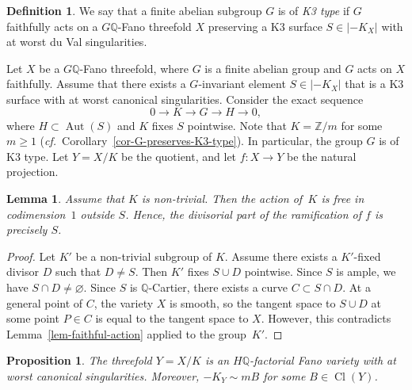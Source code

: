 \documentclass[11pt]{amsart}
\numberwithin{equation}{section}
\newtheorem{proposition}[thm]{Proposition}
\newtheorem{lem}[thm]{Lemma}
\theoremstyle{definition}
\newtheorem{defin}[thm]{Definition}
\theoremstyle{remark}
\let\emptyset\varnothing
\newcommand{\lra}{\longrightarrow}
\DeclareMathOperator{\Cl}{Cl}
\DeclareMathOperator{\Aut}{Aut}
\begin{document}
\begin{defin}
We say that a finite abelian subgroup $G$ is of \emph{K3 type} if $G$ faithfully acts on a $G\mathbb{Q}$-Fano threefold $X$ preserving a K3 surface $S\in|-K_X|$ with at worst du Val singularities.
\end{defin}

  
Let $X$ be a $G\mathbb{Q}$-Fano threefold, where $G$ is a finite abelian group and $G$ acts on $X$ faithfully. Assume that there exists a $G$-invariant element $S\in |-K_X|$ that is a K3 surface with at worst canonical singularities. Consider the  exact sequence
\[
0\lra K \lra G\lra H\lra 0, 
\]
where $H\subset \Aut(S)$ and $K$ fixes $S$ pointwise.  Note that $K=\mathbb{Z}/m$ for some $m\geq 1$ (\textit{cf.}~Corollary~\ref{cor-G-preserves-K3-type}).  In particular, the group $G$ is of K3 type.  Let $Y=X/K$ be the quotient, and let $f\colon X\to Y$ be the natural projection.

\begin{lem}
\label{lem-for-thm-2}
Assume that $K$ is non-trivial. 
Then the action of\, $K$ is free in codimension~$1$ outside $S$. 
Hence, the divisorial part of the ramification of $f$ is precisely $S$. 
\end{lem}

\begin{proof}
Let $K'$ be a non-trivial subgroup of $K$. 
Assume there exists a $K'$-fixed divisor $D$ such that $D\neq S$. 
Then $K'$ fixes $S\cup D$ pointwise. 
Since $S$ is ample, we have $S\cap D\neq\emptyset$. Since $S$ is $\mathbb{Q}$-Cartier, there exists a curve $C\subset S\cap D$. At a general point of $C$, the variety $X$ is smooth, so the tangent space to $S\cup D$ at some point $P\in C$ is equal to the tangent space to $X$. However, this contradicts Lemma~\ref{lem-faithful-action} applied to the group~$K'$.
\end{proof}

\begin{proposition}
\label{prop-K3-boundedness}
The threefold $Y=X/K$ is an $H\mathbb{Q}$-factorial Fano variety with at worst canonical singularities. Moreover, $-K_Y\sim mB$ for some $B\in \Cl(Y)$.
\end{proposition}
\end{document}
